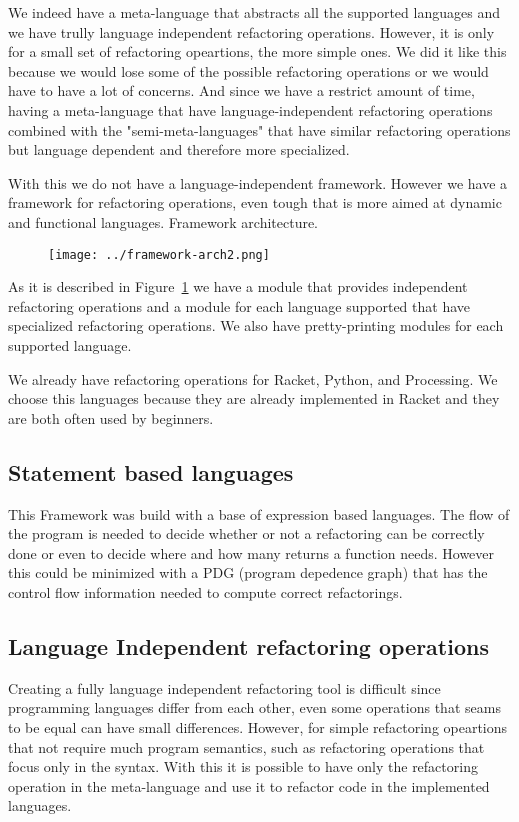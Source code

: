 We indeed have a meta-language that abstracts all the supported languages and
we have trully language independent refactoring operations. However, it is only
for a small set of refactoring opeartions, the more simple ones. We did it like
this because we would lose some of the possible refactoring operations or we would
have to have a lot of concerns. And since we have a restrict amount of time, having
a meta-language that have language-independent refactoring operations combined
with the "semi-meta-languages" that have similar refactoring operations but
language dependent and therefore more specialized.

With this we do not have a language-independent framework. However we have a framework
for refactoring operations, even tough that is more aimed at dynamic and functional languages.
Framework architecture.%
\begin{figure}[h]
\texttt{[image: ../framework-arch2.png]}
\label{fig:framework}
\end{figure}

As it is described in Figure~\ref{fig:framework} we have a module that provides
independent refactoring operations and a module for each language supported that
have specialized refactoring operations. We also have pretty-printing modules for
each supported language.

We already have refactoring operations for Racket, Python, and Processing. We choose
this languages because they are already implemented in Racket and they are both
often used by beginners.


\subsection{Statement based languages}
This Framework was build with a base of expression based languages. The flow of
the program is needed to decide whether or not a refactoring can be correctly done
or even to decide where and how many returns a function needs. However this could
be minimized with a PDG (program depedence graph) that has the control flow information
needed to compute correct refactorings.

\subsection{Language Independent refactoring operations}
Creating a fully language independent refactoring tool is difficult since programming
languages differ from each other, even some operations that seams to be equal can
have small differences. %
However, for simple refactoring opeartions that not require much program semantics,
such as refactoring operations that focus only in the syntax.
With this it is possible to have only the refactoring operation in the meta-language
and use it to refactor code in the implemented languages.
